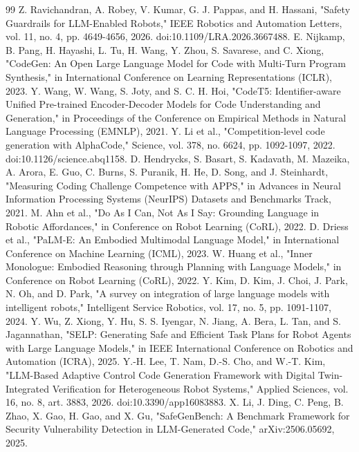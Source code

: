 \documentclass{ieeeaccess}
\begin{document}
\begin{thebibliography}{99}
 Z. Ravichandran, A. Robey, V. Kumar, G. J. Pappas, and H. Hassani, "Safety Guardrails for LLM-Enabled Robots," IEEE Robotics and Automation Letters, vol. 11, no. 4, pp. 4649-4656, 2026. doi:10.1109/LRA.2026.3667488.
 E. Nijkamp, B. Pang, H. Hayashi, L. Tu, H. Wang, Y. Zhou, S. Savarese, and C. Xiong, "CodeGen: An Open Large Language Model for Code with Multi-Turn Program Synthesis," in International Conference on Learning Representations (ICLR), 2023.
 Y. Wang, W. Wang, S. Joty, and S. C. H. Hoi, "CodeT5: Identifier-aware Unified Pre-trained Encoder-Decoder Models for Code Understanding and Generation," in Proceedings of the Conference on Empirical Methods in Natural Language Processing (EMNLP), 2021.
 Y. Li et al., "Competition-level code generation with AlphaCode," Science, vol. 378, no. 6624, pp. 1092-1097, 2022. doi:10.1126/science.abq1158.
 D. Hendrycks, S. Basart, S. Kadavath, M. Mazeika, A. Arora, E. Guo, C. Burns, S. Puranik, H. He, D. Song, and J. Steinhardt, "Measuring Coding Challenge Competence with APPS," in Advances in Neural Information Processing Systems (NeurIPS) Datasets and Benchmarks Track, 2021.
 M. Ahn et al., "Do As I Can, Not As I Say: Grounding Language in Robotic Affordances," in Conference on Robot Learning (CoRL), 2022.
 D. Driess et al., "PaLM-E: An Embodied Multimodal Language Model," in International Conference on Machine Learning (ICML), 2023.
 W. Huang et al., "Inner Monologue: Embodied Reasoning through Planning with Language Models," in Conference on Robot Learning (CoRL), 2022.
 Y. Kim, D. Kim, J. Choi, J. Park, N. Oh, and D. Park, "A survey on integration of large language models with intelligent robots," Intelligent Service Robotics, vol. 17, no. 5, pp. 1091-1107, 2024.
 Y. Wu, Z. Xiong, Y. Hu, S. S. Iyengar, N. Jiang, A. Bera, L. Tan, and S. Jagannathan, "SELP: Generating Safe and Efficient Task Plans for Robot Agents with Large Language Models," in IEEE International Conference on Robotics and Automation (ICRA), 2025.
 Y.-H. Lee, T. Nam, D.-S. Cho, and W.-T. Kim, "LLM-Based Adaptive Control Code Generation Framework with Digital Twin-Integrated Verification for Heterogeneous Robot Systems," Applied Sciences, vol. 16, no. 8, art. 3883, 2026. doi:10.3390/app16083883.
 X. Li, J. Ding, C. Peng, B. Zhao, X. Gao, H. Gao, and X. Gu, "SafeGenBench: A Benchmark Framework for Security Vulnerability Detection in LLM-Generated Code," arXiv:2506.05692, 2025.

\end{thebibliography}
\end{document}
